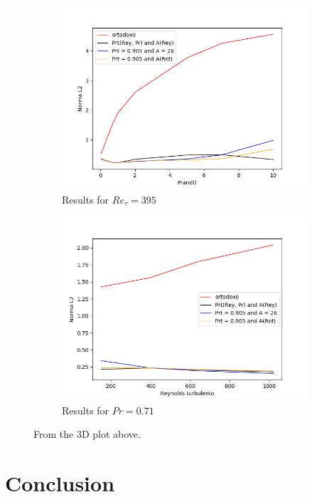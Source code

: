 \documentclass[10pt]{article} %
\begin{document}
\begin{figure}[!h]
	\centering
\begin{subfigure}[t]{0.49\textwidth}
	\centering
	\includegraphics[angle=0, scale=0.35]{finaispr}
	\caption{Results for $Re_\tau = 395$}
\end{subfigure}
\begin{subfigure}[t]{0.49\textwidth}
	\centering
	\includegraphics[angle=0, scale=0.35]{finaisRey}
	\caption{Results for $Pr = 0.71$}
\end{subfigure}
\caption{From the 3D plot above.}
\end{figure}

\section{Conclusion}
\end{document}
